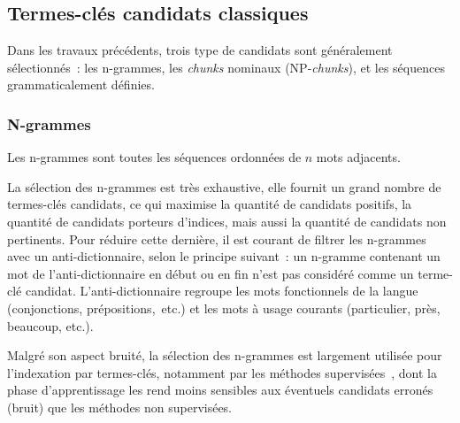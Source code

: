     \subsection{Termes-clés candidats classiques}
    \label{subsec:main-state_of_the_art-keyphrase_candidate_selection-keyphrase_candidate_nature}
      Dans les travaux précédents, trois type de candidats sont généralement
      sélectionnés~: les n-grammes, les \textit{chunks} nominaux
      (NP-\textit{chunks}), et les séquences grammaticalement définies.

      \subsubsection{N-grammes}
      \label{subsubsec:main-state_of_the_art-automatic_keyphrase_extraction-automatic_keyphrase_extraction-n_grams}
        Les n-grammes sont
        toutes les séquences ordonnées de $n$ mots adjacents.

        \begin{example}
        \end{example}

        La sélection des n-grammes est très exhaustive, elle fournit un grand
        nombre de termes-clés candidats, ce qui maximise la quantité de
        candidats positifs, la quantité de candidats porteurs d'indices, mais
        aussi la quantité de candidats non pertinents. Pour réduire cette
        dernière, il est courant de filtrer les n-grammes avec un
        anti-dictionnaire, selon le principe suivant~: un n-gramme
        contenant un mot de l'anti-dictionnaire en début ou en fin n'est pas
        considéré comme un terme-clé candidat. L'anti-dictionnaire regroupe les
        mots fonctionnels de la langue (conjonctions, prépositions,~etc.) et les
        mots à usage courants (\og{}particulier\fg{}, \og{}près\fg{},
        \og{}beaucoup\fg{}, etc.).
        
        Malgré son aspect bruité, la sélection des n-grammes est largement
        utilisée pour l'indexation par termes-clés, notamment par les méthodes
        supervisées~\cite{witten1999kea,turney1999learningalgorithms,hulth2003keywordextraction},
        dont la phase d'apprentissage les rend moins sensibles aux éventuels
        candidats erronés (bruit) que les méthodes non supervisées.

